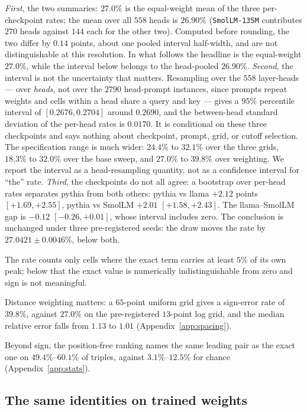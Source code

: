 \documentclass{article}
\theoremstyle{plain}
\theoremstyle{remark}
\begin{document}
\emph{First}, the two summaries: $27.0\%$ is the equal-weight mean of the
three per-checkpoint rates; the mean over all $558$ heads is $26.90\%$
(\texttt{SmolLM-135M} contributes $270$ heads against $144$ each for the other
two). Computed before rounding, the two differ by $0.14$ points, about one
pooled interval half-width, and are not distinguishable at this resolution. In what
follows the headline is the equal-weight $27.0\%$, while the interval below
belongs to the head-pooled $26.90\%$.
\emph{Second}, the interval is not the uncertainty that matters. Resampling over
the $558$ layer-heads --- over \emph{heads}, not over the $2790$ head-prompt
instances, since prompts repeat weights and cells within a head share a query
and key --- gives a $95\%$ percentile interval of $[0.2676, 0.2704]$ around
$0.2690$, and the between-head standard deviation of the per-head rates is
$0.0170$. It is conditional on these three checkpoints and says nothing about
checkpoint, prompt, grid, or cutoff selection. The specification range is much
wider: $24.4\%$ to $32.1\%$ over the three grids, $18.3\%$ to $32.0\%$ over the
base sweep, and $27.0\%$ to $39.8\%$ over weighting. We report the interval as
a head-resampling quantity, not as a confidence interval for ``the'' rate.
\emph{Third}, the checkpoints do not all agree: a bootstrap over per-head rates
separates pythia from both others: pythia vs llama $+2.12$ points
$[+1.69, +2.55]$, pythia vs SmolLM $+2.01$ $[+1.58, +2.43]$. The llama--SmolLM
gap is $-0.12$ $[-0.26, +0.01]$, whose interval includes zero. The conclusion is
unchanged under three pre-registered seeds: the draw moves the rate by
$27.0421 \pm 0.0046\%$, below both.

The rate counts only cells where the exact term carries at least $5\%$ of its
own peak; below that the exact value is numerically indistinguishable from zero
and sign is not meaningful.

Distance weighting matters: a $65$-point uniform grid gives a sign-error rate of
$39.8\%$, against $27.0\%$ on the pre-registered $13$-point log grid, and the
median relative error falls from $1.13$ to $1.01$ (Appendix~\ref{app:spacing}).

Beyond sign, the position-free ranking names the same leading pair as the exact
one on $49.4\%$--$60.1\%$ of triples, against $3.1\%$--$12.5\%$ for chance
(Appendix~\ref{app:stats}).

\subsection{The same identities on trained weights}
\label{sec:trained}
\end{document}
